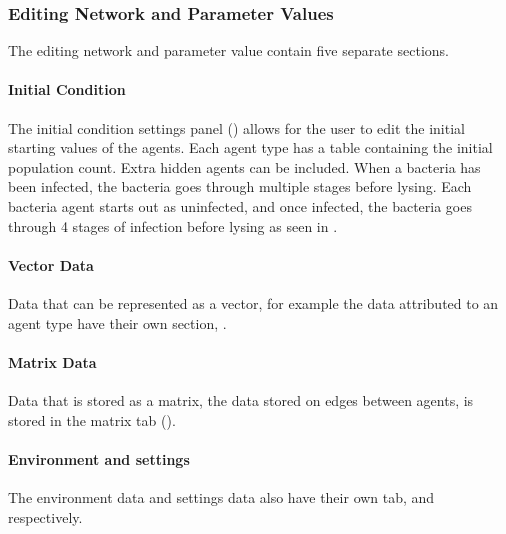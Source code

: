 \subsubsection{Editing Network and Parameter Values}
\label{sec:editing_network_and_parameter_values}
The editing network and parameter value contain five separate sections.
\paragraph{Initial Condition}
The initial condition settings panel () allows for the user to edit the initial starting values of the agents. 
Each agent type has a table containing the initial population count. 
Extra hidden agents can be included. 
When a bacteria has been infected, the bacteria goes through multiple stages before lysing. Each bacteria agent starts out as uninfected, and once infected, the bacteria goes through 4 stages of infection before lysing as seen in .  
\paragraph{Vector Data} 
Data that can be represented as a vector, for example the data attributed to an agent type have their own section, .
\paragraph{Matrix Data}
Data that is stored as a matrix, the data stored on edges between agents, is stored in the matrix tab ().
\paragraph{Environment and settings}
The environment data and settings data also have their own tab,  and  respectively.

